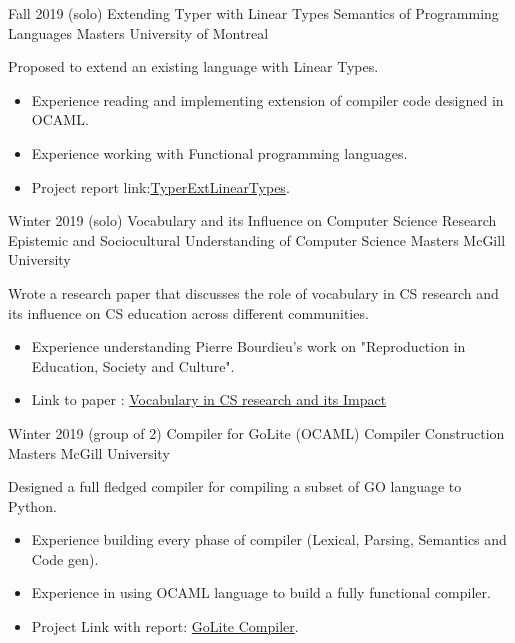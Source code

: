         \cventry
            {Fall 2019 (solo)} %
            {Extending Typer with Linear Types} %
            {Semantics of Programming Languages} %
            {Masters} 
            {University of Montreal} %
            {
                Proposed to extend an existing language with Linear Types.
                \begin{itemize} %
                    \item Experience reading and implementing extension of compiler code designed in OCAML. 
                    \item Experience working with Functional programming languages. 
                    \item Project report link:\href{https://www.overleaf.com/read/vbmgfqzjkysk}{TyperExtLinearTypes}.
                \end{itemize}
            }
            {}

        \cventry
            {Winter 2019 (solo)} %
            {Vocabulary and its Influence on Computer Science Research} %
            {Epistemic and Sociocultural Understanding of Computer Science} %
            {Masters} 
            {McGill University} %
            {
                Wrote a research paper that discusses the role of vocabulary in CS research and its influence on CS education across different communities.
                \begin{itemize} %
                    \item Experience understanding Pierre Bourdieu's work on "Reproduction in Education, Society and Culture".
                    \item Link to paper : \href{https://www.overleaf.com/read/qpnksypscjhc}{Vocabulary in CS research and its Impact}
                \end{itemize}
            }
            {}

        \cventry
            {Winter 2019 (group of 2)} %
            {Compiler for GoLite (OCAML)} %
            {Compiler Construction} %
            {Masters} 
            {McGill University} %
            {
                Designed a full fledged compiler for compiling a subset of GO language to Python.
                \begin{itemize} %
                    \item Experience building every phase of compiler (Lexical, Parsing, Semantics and Code gen). 
                    \item Experience in using OCAML language to build a fully functional compiler.
                    \item Project Link with report: \href{https://github.com/comp520/2019_group15.git}{GoLite Compiler}.
                \end{itemize}
            }
            {}

